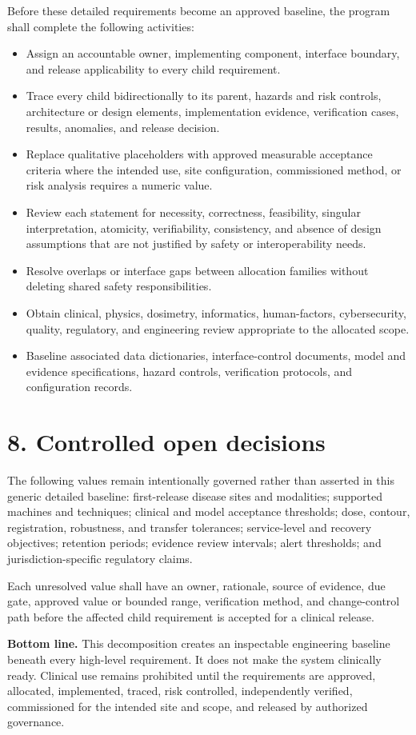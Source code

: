 \documentclass[11pt,letterpaper]{article}
\begin{document}
Before these detailed requirements become an approved baseline, the program shall complete the following activities:
\begin{itemize}
\item Assign an accountable owner, implementing component, interface boundary, and release applicability to every child requirement.
\item Trace every child bidirectionally to its parent, hazards and risk controls, architecture or design elements, implementation evidence, verification cases, results, anomalies, and release decision.
\item Replace qualitative placeholders with approved measurable acceptance criteria where the intended use, site configuration, commissioned method, or risk analysis requires a numeric value.
\item Review each statement for necessity, correctness, feasibility, singular interpretation, atomicity, verifiability, consistency, and absence of design assumptions that are not justified by safety or interoperability needs.
\item Resolve overlaps or interface gaps between allocation families without deleting shared safety responsibilities.
\item Obtain clinical, physics, dosimetry, informatics, human-factors, cybersecurity, quality, regulatory, and engineering review appropriate to the allocated scope.
\item Baseline associated data dictionaries, interface-control documents, model and evidence specifications, hazard controls, verification protocols, and configuration records.
\end{itemize}

\section{8. Controlled open decisions}

The following values remain intentionally governed rather than asserted in this generic detailed baseline: first-release disease sites and modalities; supported machines and techniques; clinical and model acceptance thresholds; dose, contour, registration, robustness, and transfer tolerances; service-level and recovery objectives; retention periods; evidence review intervals; alert thresholds; and jurisdiction-specific regulatory claims.

Each unresolved value shall have an owner, rationale, source of evidence, due gate, approved value or bounded range, verification method, and change-control path before the affected child requirement is accepted for a clinical release.

\textbf{Bottom line. }This decomposition creates an inspectable engineering baseline beneath every high-level requirement. It does not make the system clinically ready. Clinical use remains prohibited until the requirements are approved, allocated, implemented, traced, risk controlled, independently verified, commissioned for the intended site and scope, and released by authorized governance.
\end{document}
